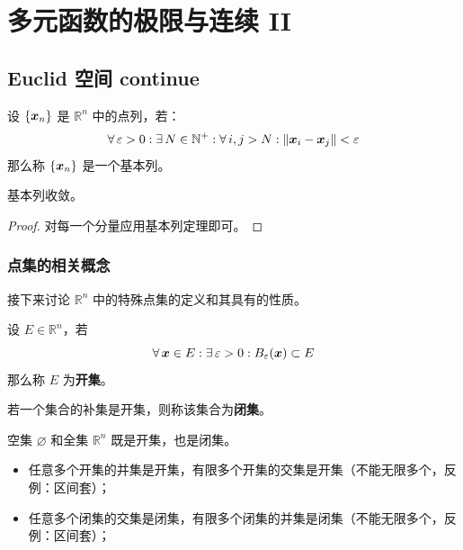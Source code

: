 \section{多元函数的极限与连续 II}

\subsection{Euclid 空间 continue}

\begin{definition}[基本列]
    设 $\{\boldsymbol{x}_n\}$ 是 $\mathbb{R}^{n}$ 中的点列，若：
    $$
    \forall\,\varepsilon > 0: \exists\,N \in \mathbb{N}^{+}: \forall\,i, j > N: \norm{\boldsymbol{x}_i - \boldsymbol{x}_j} < \varepsilon
    $$
    那么称 $\{\boldsymbol{x}_n\}$ 是一个基本列。
\end{definition}

\begin{theorem}
    基本列收敛。

    \begin{proof}
        对每一个分量应用基本列定理即可。
    \end{proof}
\end{theorem}

\subsubsection{点集的相关概念}

接下来讨论 $\mathbb{R}^{n}$ 中的特殊点集的定义和其具有的性质。

\begin{definition}[开集和闭集]
    设 $E \in \mathbb{R}^{n}$，若
    $$
    \forall\,\boldsymbol{x} \in E: \exists\,\varepsilon > 0: B_{\varepsilon}(\boldsymbol{x}) \subset E
    $$
    那么称 $E$ 为\textbf{开集}。

    若一个集合的补集是开集，则称该集合为\textbf{闭集}。
\end{definition}

\begin{remark}
    空集 $\varnothing$ 和全集 $\mathbb{R}^n$ 既是开集，也是闭集。
\end{remark}

\begin{property}
    \begin{itemize}
        \item 任意多个开集的并集是开集，有限多个开集的交集是开集（不能无限多个，反例：区间套）；
        \item 任意多个闭集的交集是闭集，有限多个闭集的并集是闭集（不能无限多个，反例：区间套）；
    \end{itemize}
\end{property}

